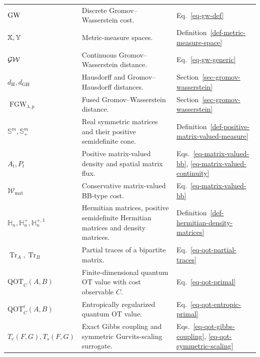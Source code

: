{\begin{longtable}{>{\raggedright\arraybackslash}p{}
                  >{\raggedright\arraybackslash}p{}
                  >{\raggedright\arraybackslash}p{}}
$\operatorname{\mathrm{GW}}$ & Discrete Gromov--Wasserstein cost. & Eq.~\eqref{eq-gw-def} \\
$\mathbb{X},\mathbb{Y}$ & Metric-measure spaces. & Definition~\ref{def-metric-measure-space} \\
$\operatorname{\mathcal{GW}}$ & Continuous Gromov--Wasserstein distance. & Eq.~\eqref{eq-gw-generic} \\
$d_{\mathrm H},d_{\mathrm{GH}}$ & Hausdorff and Gromov--Hausdorff distances. & Section~\ref{sec-gromov-wasserstein} \\
$\operatorname{FGW}_{\lambda,p}$ & Fused Gromov--Wasserstein distance. & Section~\ref{sec-gromov-wasserstein} \\
$\mathbb S^m,\mathbb S_+^m$ & Real symmetric matrices and their positive semidefinite cone. & Definition~\ref{def-positive-matrix-valued-measure} \\
$A_t,P_t$ & Positive matrix-valued density and spatial matrix flux. & Eqs.~\eqref{eq-matrix-valued-bb}, \eqref{eq-matrix-valued-continuity} \\
$\mathcal W_{\mathrm{mat}}$ & Conservative matrix-valued BB-type cost. & Eq.~\eqref{eq-matrix-valued-bb} \\
$\mathbb H_n,\mathbb H_n^+,\mathbb H_n^{+,1}$ & Hermitian matrices, positive semidefinite Hermitian matrices and density matrices. & Definition~\ref{def-hermitian-density-matrices} \\
$\operatorname{Tr}_A,\operatorname{Tr}_B$ & Partial traces of a bipartite matrix. & Eq.~\eqref{eq-qot-partial-traces} \\
$\mathrm{QOT}_C(A,B)$ & Finite-dimensional quantum OT value with cost observable $C$. & Eq.~\eqref{eq-qot-primal} \\
$\mathrm{QOT}_C^\epsilon(A,B)$ & Entropically regularized quantum OT value. & Eq.~\eqref{eq-qot-entropic-primal} \\
$T_e(F,G),T_s(F,G)$ & Exact Gibbs coupling and symmetric Gurvits-scaling surrogate. & Eqs.~\eqref{eq-qot-gibbs-coupling}, \eqref{eq-qot-symmetric-scaling} \\


\end{longtable}}
